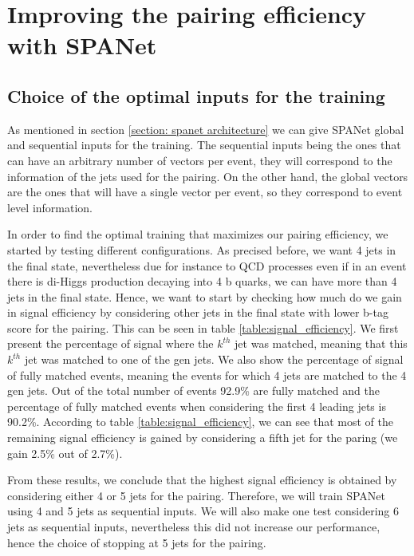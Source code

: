 \section{Improving the pairing efficiency with SPANet}


\subsection{Choice of the optimal inputs for the training}
As mentioned in section \ref{section: spanet architecture} we can give SPANet global and sequential inputs for the training. The sequential inputs being the ones that can have an arbitrary number of vectors per event, they will correspond to the information of the jets used for the pairing. On the other hand, the global vectors are the ones that will have a single vector per event, so they correspond to event level information.

In order to find the optimal training that maximizes our pairing efficiency, we started by testing different configurations. As precised before, we want 4 jets in the final state, nevertheless due for instance to QCD processes even if in an event there is di-Higgs production decaying into 4 b quarks, we can have more than 4 jets in the final state. Hence, we want to start by checking how much do we gain in signal efficiency by considering other jets in the final state with lower b-tag score for the pairing. This can be seen in table \ref{table:signal_efficiency}. We first present the percentage of signal where the $k^{th}$ jet was matched, meaning that this $k^{th}$ jet was matched to one of the gen jets. We also show the percentage of signal of fully matched events, meaning the events for which 4 jets are matched to the 4 gen jets. Out of the total number of events 92.9\% are fully matched and the percentage of fully matched events when considering the first 4 leading jets is 90.2\%. According to table \ref{table:signal_efficiency}, we can see that most of the remaining signal efficiency is gained by considering a fifth jet for the paring (we gain 2.5\% out of 2.7\%). 

From these results, we conclude that the highest signal efficiency is obtained by considering either 4 or 5 jets for the pairing. Therefore, we will train SPANet using 4 and 5 jets as sequential inputs. We will also make one test considering 6 jets as sequential inputs, nevertheless this did not increase our performance, hence the choice of stopping at 5 jets for the pairing.


